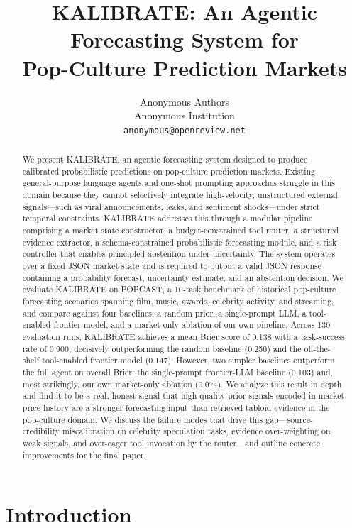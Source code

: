 \documentclass{article} %
\title{KALIBRATE: An Agentic Forecasting System for\\Pop-Culture Prediction Markets}
\author{Anonymous Authors \\
Anonymous Institution \\
\texttt{anonymous@openreview.net}
}
\newcommand{\agentname}{KALIBRATE}
\newcommand{\benchmarkname}{POPCAST}
\begin{document}
\maketitle

\begin{abstract}
We present \agentname{}, an agentic forecasting system designed to produce calibrated probabilistic predictions on pop-culture prediction markets. Existing general-purpose language agents and one-shot prompting approaches struggle in this domain because they cannot selectively integrate high-velocity, unstructured external signals—such as viral announcements, leaks, and sentiment shocks—under strict temporal constraints. \agentname{} addresses this through a modular pipeline comprising a market state constructor, a budget-constrained tool router, a structured evidence extractor, a schema-constrained probabilistic forecasting module, and a risk controller that enables principled abstention under uncertainty. The system operates over a fixed JSON market state and is required to output a valid JSON response containing a probability forecast, uncertainty estimate, and an abstention decision. We evaluate \agentname{} on \benchmarkname{}, a 10-task benchmark of historical pop-culture forecasting scenarios spanning film, music, awards, celebrity activity, and streaming, and compare against four baselines: a random prior, a single-prompt LLM, a tool-enabled frontier model, and a market-only ablation of our own pipeline. Across 130 evaluation runs, \agentname{} achieves a mean Brier score of 0.138 with a task-success rate of 0.900, decisively outperforming the random baseline (0.250) and the off-the-shelf tool-enabled frontier model (0.147). However, two simpler baselines outperform the full agent on overall Brier: the single-prompt frontier-LLM baseline (0.103) and, most strikingly, our own market-only ablation (0.074). We analyze this result in depth and find it to be a real, honest signal that high-quality prior signals encoded in market price history are a stronger forecasting input than retrieved tabloid evidence in the pop-culture domain. We discuss the failure modes that drive this gap—source-credibility miscalibration on celebrity speculation tasks, evidence over-weighting on weak signals, and over-eager tool invocation by the router—and outline concrete improvements for the final paper.
\end{abstract}

\section{Introduction}
\label{sec:intro}
\end{document}
